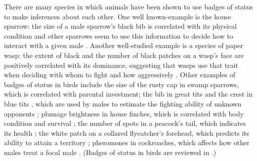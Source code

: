 There are many species in which animals have been shown to use badges of status to make inferences about each other. One well known-example is the house sparrow: the size of a male sparrow's black bib is correlated with its physical condition and other sparrows seem to use this information to decide how to interact with a given male \cite{Moller:1987vn}. Another well-studied example is a species of paper wasp: the extent of black and the number of black patches on a wasp's face are positively correlated with its dominance, suggesting that wasps use that trait when deciding with whom to fight and how aggressively \cite{Tibbetts:2004kx,Tibbetts:2007zr}. Other examples of badges of status in birds include the size of the rusty cap in swamp sparrows, which is correlated with parental investment\cite{Olsen:2010uq}; the bib in great tits \cite{Lemel:1993ve} and the crest in blue tits \cite{Remy:2010fk}, which are used by males to estimate the fighting ability of unknown opponents \cite{Lemel:1993ve}; plumage brightness in house finches, which is correlated with body condition and survival \cite{McGraw:2000qf}; the number of spots in a peacock's tail, which indicates its health \cite{Loyau:2005nx}; the white patch on a collared flycatcher's forehead, which predicts its ability to attain a territory \cite{Part:1997ys}; pheromones in cockroaches, which affects how other males treat a focal male \cite{Moore:1997kx}. (Badges of status in birds are reviewed in \cite{Young:2015dq,Jawor:2003bh,Santos:2011ly,Senar:2006dq}.) 



